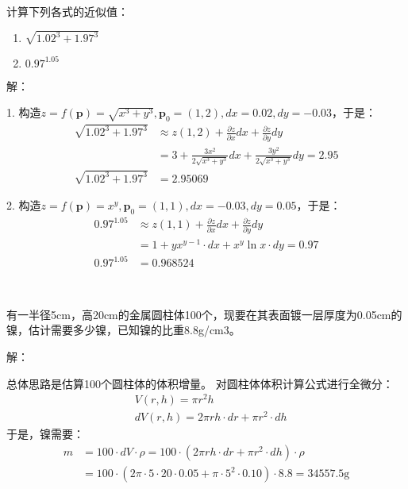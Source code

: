 ~

\begin{exercise}
计算下列各式的近似值：
\begin{enumerate}
    \item $\sqrt{1.02^3+1.97^3}$
    \item $0.97^{1.05}$
\end{enumerate}
\end{exercise}

解：

1.
构造$z=f\left( \boldsymbol{p} \right) =\sqrt{x^3+y^3},\boldsymbol{p}_0=\left( 1,2 \right) ,dx=0.02,dy=-0.03$，于是：
\begin{align*}
\sqrt{1.02^3+1.97^3}&\approx z\left( 1,2 \right) +\frac{\partial z}{\partial x}dx+\frac{\partial z}{\partial y}dy \\
&=3+\frac{3x^2}{2\sqrt{x^3+y^3}}dx+\frac{3y^2}{2\sqrt{x^3+y^3}}dy=2.95 \\
\sqrt{1.02^3+1.97^3}&=2.95069
\end{align*}

2.
构造$z=f\left( \boldsymbol{p} \right) =x^y,\boldsymbol{p}_0=\left( 1,1 \right) ,dx=-0.03,dy=0.05$，于是：
\begin{align*}
0.97^{1.05}&\approx z\left( 1,1 \right) +\frac{\partial z}{\partial x}dx+\frac{\partial z}{\partial y}dy \\
&=1+yx^{y-1}\cdot dx+x^y\ln x\cdot dy=0.97 \\
0.97^{1.05}&=0.968524
\end{align*}

~

\begin{exercise}
有一半径5cm，高20cm的金属圆柱体100个，现要在其表面镀一层厚度为0.05cm的镍，估计需要多少镍，已知镍的比重8.8g/cm3。
\end{exercise}

解：

总体思路是估算100个圆柱体的体积增量。
对圆柱体体积计算公式进行全微分：
\begin{align*}
&V\left( r,h \right) =\pi r^2h \\
&dV\left( r,h \right) =2\pi rh\cdot dr+\pi r^2\cdot dh
\end{align*}
于是，镍需要：
\begin{align*}
m&=100\cdot dV\cdot \rho =100\cdot \left( 2\pi rh\cdot dr+\pi r^2\cdot dh \right) \cdot \rho \\
&=100\cdot \left( 2\pi \cdot 5\cdot 20\cdot 0.05+\pi \cdot 5^2\cdot 0.10 \right) \cdot 8.8=34557.5\mathrm{g}
\end{align*}

